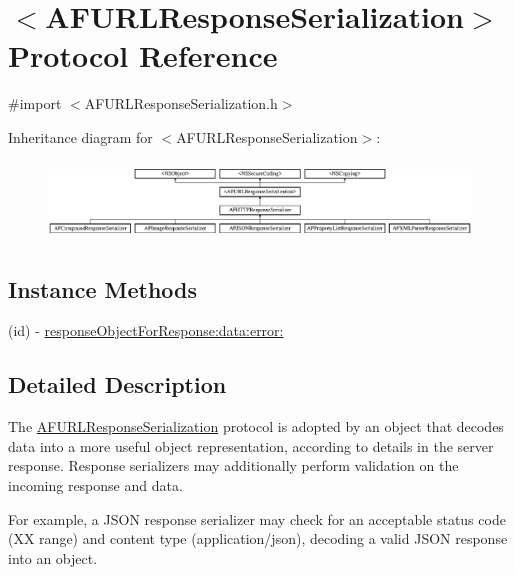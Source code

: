 \hypertarget{protocol_a_f_u_r_l_response_serialization-p}{}\section{$<$A\+F\+U\+R\+L\+Response\+Serialization$>$ Protocol Reference}
\label{protocol_a_f_u_r_l_response_serialization-p}


{\ttfamily \#import $<$A\+F\+U\+R\+L\+Response\+Serialization.\+h$>$}

Inheritance diagram for $<$A\+F\+U\+R\+L\+Response\+Serialization$>$\+:\begin{figure}[H]
\begin{center}
\leavevmode
\includegraphics[height=2.093458cm]{protocol_a_f_u_r_l_response_serialization-p}
\end{center}
\end{figure}
\subsection*{Instance Methods}
\begin{DoxyCompactItemize}
\item 
(id) -\/ \hyperlink{protocol_a_f_u_r_l_response_serialization-p_a151c5671cda99d602f7dc5fc3318725e}{response\+Object\+For\+Response\+:data\+:error\+:}
\end{DoxyCompactItemize}


\subsection{Detailed Description}
The {\ttfamily \hyperlink{protocol_a_f_u_r_l_response_serialization-p}{A\+F\+U\+R\+L\+Response\+Serialization}} protocol is adopted by an object that decodes data into a more useful object representation, according to details in the server response. Response serializers may additionally perform validation on the incoming response and data.

For example, a J\+S\+O\+N response serializer may check for an acceptable status code ({\+X\+X} range) and content type ({\ttfamily application/json}), decoding a valid J\+S\+O\+N response into an object. 

